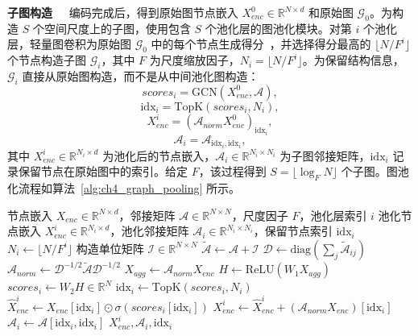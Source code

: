 \noindent\textbf{子图构造\ \ } 编码完成后，得到原始图节点嵌入 $X_{enc}^0\in\mathbb{R}^{N\times d}$ 和原始图 $\mathcal{G}_0$。为构造 $S$ 个空间尺度上的子图，使用包含 $S$ 个池化层的图池化模块。对第 $i$ 个池化层，轻量图卷积为原始图 $\mathcal{G}_0$ 中的每个节点生成得分~\cite{sagpool}，并选择得分最高的 $\lfloor N/F^{i}\rfloor$ 个节点构造子图 $\mathcal{G}_i$，其中 $F$ 为尺度缩放因子，$N_i=\lfloor N/F^{i}\rfloor$。为保留结构信息，$\mathcal{G}_i$ 直接从原始图构造，而不是从中间池化图构造：
\begin{equation}
scores_i=\mathrm{GCN}\!\left(X_{enc}^0,\mathcal{A}\right),
\end{equation}
\begin{equation}
\mathrm{idx}_i=\mathrm{TopK}\!\left(scores_i,N_i\right),
\end{equation}
\begin{equation}
X_{enc}^i=\left(\mathcal{A}_{norm}X_{enc}^0\right)_{\mathrm{idx}_i},
\end{equation}
\begin{equation}
\mathcal{A}_i=\mathcal{A}_{\mathrm{idx}_i,\mathrm{idx}_i},
\end{equation}
其中 $X_{enc}^i\in\mathbb{R}^{N_i\times d}$ 为池化后的节点嵌入，$\mathcal{A}_i\in\mathbb{R}^{N_i\times N_i}$ 为子图邻接矩阵，$\mathrm{idx}_i$ 记录保留节点在原始图中的索引。给定 $F$，该过程得到 $S=\lfloor\log_F N\rfloor$ 个子图。图池化流程如算法~\ref{alg:ch4_graph_pooling} 所示。

\begin{algorithm}[t!]
\caption{图池化构造第 $i$ 个尺度子图 $S_i$}
\label{alg:ch4_graph_pooling}
\begin{algorithmic}[1]
\REQUIRE 节点嵌入 $X_{enc}\in\mathbb{R}^{N\times d}$，邻接矩阵 $\mathcal{A}\in\mathbb{R}^{N\times N}$，尺度因子 $F$，池化层索引 $i$
\ENSURE 池化节点嵌入 $X_{enc}^i\in\mathbb{R}^{N_i\times d}$，池化邻接矩阵 $\mathcal{A}_i\in\mathbb{R}^{N_i\times N_i}$，保留节点索引 $\mathrm{idx}_i$
\STATE $N_i\leftarrow\lfloor N/F^{i}\rfloor$
\STATE 构造单位矩阵 $\mathcal{I}\in\mathbb{R}^{N\times N}$
\STATE $\tilde{\mathcal{A}}\leftarrow\mathcal{A}+\mathcal{I}$
\STATE $\mathcal{D}\leftarrow\mathrm{diag}\!\left(\sum_j\tilde{\mathcal{A}}_{ij}\right)$
\STATE $\mathcal{A}_{norm}\leftarrow\mathcal{D}^{-1/2}\tilde{\mathcal{A}}\mathcal{D}^{-1/2}$
\STATE $X_{agg}\leftarrow\mathcal{A}_{norm}X_{enc}$
\STATE $H\leftarrow\mathrm{ReLU}\!\left(W_1X_{agg}\right)$
\STATE $scores_i\leftarrow W_2H\in\mathbb{R}^{N}$
\STATE $\mathrm{idx}_i\leftarrow\mathrm{TopK}\!\left(scores_i,N_i\right)$
\STATE $\hat{X}_{enc}^i\leftarrow X_{enc}[\mathrm{idx}_i]\odot\sigma\!\left(scores_i[\mathrm{idx}_i]\right)$
\STATE $X_{enc}^i\leftarrow\hat{X}_{enc}^i+\left(\mathcal{A}_{norm}X_{enc}\right)[\mathrm{idx}_i]$
\STATE $\mathcal{A}_i\leftarrow\mathcal{A}[\mathrm{idx}_i,\mathrm{idx}_i]$
\STATE \RETURN $X_{enc}^i,\mathcal{A}_i,\mathrm{idx}_i$
\end{algorithmic}
\end{algorithm}

